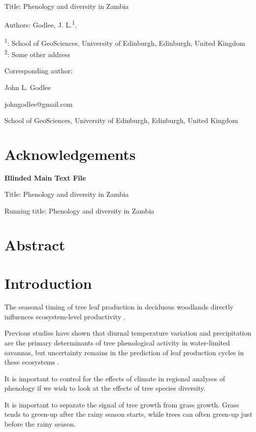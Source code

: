 \documentclass[11pt,a4paper]{article}
\newcommand{\titletext}{Phenology and diversity in Zambia}
\begin{document}
{\LARGE{Title: \titletext}}

\vspace{1cm}

Authors: Godlee, J. L.\textsuperscript{1}, 

\textsuperscript{1}: School of GeoSciences, University of Edinburgh, Edinburgh, United Kingdom \\
\textsuperscript{2}: Some other address

\vspace{1em}
Corresponding author:

John L. Godlee

johngodlee@gmail.com

School of GeoSciences, University of Edinburgh, Edinburgh, United Kingdom

\section{Acknowledgements}

\newpage{}

{\LARGE{\textbf{Blinded Main Text File}}}

\LARGE{Title: \titletext}

\normalsize{Running title: \titletext}

\section{Abstract}

\section{Introduction}

The seasonal timing of tree leaf production in deciduous woodlands directly influences ecosystem-level productivity \citep{}. 

Previous studies have shown that diurnal temperature variation and precipitation are the primary determinants of tree phenological activity in water-limited savannas, but uncertainty remains in the prediction of leaf production cycles in these ecosystems \citep{}. 

It is important to control for the effects of climate in regional analyses of phenology if we wish to look at the effects of tree species diversity.

It is important to separate the signal of tree growth from grass growth. Grass tends to green-up after the rainy season starts, while trees can often green-up just before the rainy season.
\end{document}
